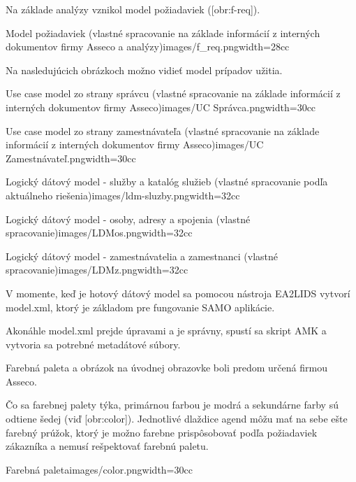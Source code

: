Na základe analýzy vznikol model požiadaviek ([obr:f-req]).

{Model požiadaviek (vlastné spracovanie na základe informácií z interných dokumentov firmy Asseco a analýzy)}{images/f_req.png}{width=28cc}


Na nasledujúcich obrázkoch možno vidieť model prípadov užitia.

{Use case model zo strany správcu (vlastné spracovanie na základe informácií z interných dokumentov firmy Asseco)}{images/UC Správca.png}{width=30cc}

{Use case model zo strany zamestnávateľa (vlastné spracovanie na základe informácií z interných dokumentov firmy Asseco)}{images/UC Zamestnávateľ.png}{width=30cc}








{Logický dátový model - služby a katalóg služieb (vlastné spracovanie podľa aktuálneho riešenia)}{images/ldm-sluzby.png}{width=32cc}

{Logický dátový model - osoby, adresy a spojenia (vlastné spracovanie)}{images/LDMos.png}{width=32cc}

{Logický dátový model - zamestnávatelia a zamestnanci (vlastné spracovanie)}{images/LDMz.png}{width=32cc}

V momente, keď je hotový dátový model sa pomocou nástroja EA2LIDS vytvorí model.xml, ktorý je základom pre fungovanie SAMO aplikácie. 

Akonáhle model.xml prejde úpravami a je správny, spustí sa skript AMK a vytvoria sa potrebné metadátové súbory. 

Farebná paleta a obrázok na úvodnej obrazovke boli predom určená firmou Asseco.

Čo sa farebnej palety týka, primárnou farbou je modrá a sekundárne farby sú odtiene šedej (viď [obr:color]). Jednotlivé dlaždice agend môžu mať na sebe ešte farebný prúžok, ktorý je možno farebne prispôsobovať podľa požiadaviek zákazníka a nemusí rešpektovať farebnú paletu.

{Farebná paleta}{images/color.png}{width=30cc} 

